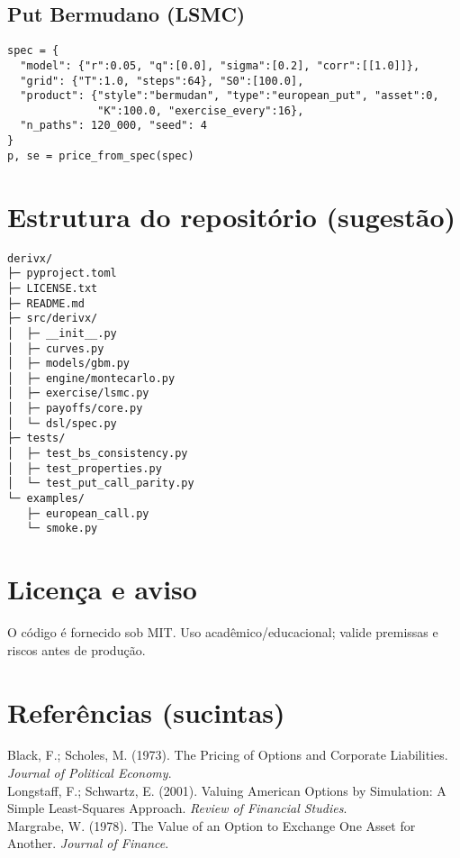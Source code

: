 \documentclass[11pt,a4paper]{article}
\begin{document}
\subsection{Put Bermudano (LSMC)}
\begin{lstlisting}[style=pystyle]
spec = {
  "model": {"r":0.05, "q":[0.0], "sigma":[0.2], "corr":[[1.0]]},
  "grid": {"T":1.0, "steps":64}, "S0":[100.0],
  "product": {"style":"bermudan", "type":"european_put", "asset":0,
              "K":100.0, "exercise_every":16},
  "n_paths": 120_000, "seed": 4
}
p, se = price_from_spec(spec)
\end{lstlisting}

\section{Estrutura do repositório (sugestão)}
\begin{verbatim}
derivx/
├─ pyproject.toml
├─ LICENSE.txt
├─ README.md
├─ src/derivx/
│  ├─ __init__.py
│  ├─ curves.py
│  ├─ models/gbm.py
│  ├─ engine/montecarlo.py
│  ├─ exercise/lsmc.py
│  ├─ payoffs/core.py
│  └─ dsl/spec.py
├─ tests/
│  ├─ test_bs_consistency.py
│  ├─ test_properties.py
│  └─ test_put_call_parity.py
└─ examples/
   ├─ european_call.py
   └─ smoke.py
\end{verbatim}

\section{Licença e aviso}
O código é fornecido sob MIT. Uso acadêmico/educacional; valide premissas e riscos antes de produção.

\section*{Referências (sucintas)}
\noindent
Black, F.; Scholes, M. (1973). The Pricing of Options and Corporate Liabilities. \emph{Journal of Political Economy}.\\
Longstaff, F.; Schwartz, E. (2001). Valuing American Options by Simulation: A Simple Least-Squares Approach. \emph{Review of Financial Studies}.\\
Margrabe, W. (1978). The Value of an Option to Exchange One Asset for Another. \emph{Journal of Finance}.
\end{document}
